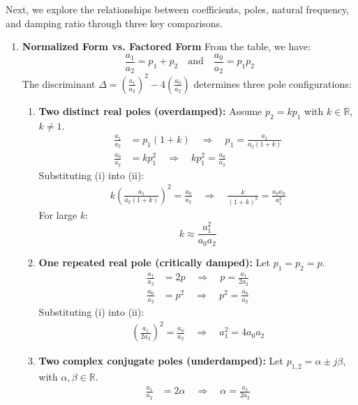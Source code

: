 Next, we explore the relationships between coefficients, poles,
natural frequency, and damping ratio through three key comparisons.
\begin{enumerate}
  \item \textbf{Normalized Form vs. Factored Form}
    \noindent From the table, we have:
    \[ \frac{a_1}{a_2} = p_1 + p_2 \quad \text{and} \quad \frac{a_0}{a_2} = p_1 p_2 \]
    The discriminant
    \(\displaystyle \Delta = \left( \frac{a_1}{a_2} \right)^2 - 4 \left( \frac{a_0}{a_2} \right) \)
    determines three pole configurations:
    \begin{enumerate}
      \item \textbf{Two distinct real poles (overdamped):} Assume \( p_2 = k p_1 \) with \( k \in \mathbb{R} \), \( k \neq 1 \).
        \begin{align*}
          \frac{a_1}{a_2} &= p_1(1 + k) \quad \Rightarrow \quad p_1 = \frac{a_1}{a_2(1 + k)} \tag{i} \\
          \frac{a_0}{a_2} &= k p_1^2 \quad \Rightarrow \quad k p_1^2 = \frac{a_0}{a_2} \tag{ii}
        \end{align*}
        Substituting (i) into (ii):
        \begin{align*}
        k \left( \frac{a_1}{a_2(1 + k)} \right)^2 = \frac{a_0}{a_2}
        \quad \Rightarrow \quad
        \frac{k}{(1+k)^2} = \frac{a_0 a_2}{a_1^2}
        \end{align*}
        For large \(k\):
        \[ k \approx \frac{a_1^2}{a_0 a_2} \]
      \item \textbf{One repeated real pole (critically damped):} Let \( p_1 = p_2 = p \).
        \begin{align*}
          \frac{a_1}{a_2} &= 2p \quad \Rightarrow \quad p = \frac{a_1}{2a_2} \tag{i} \\
          \frac{a_0}{a_2} &= p^2 \quad \Rightarrow \quad p^2 = \frac{a_0}{a_2} \tag{ii}
        \end{align*}
        Substituting (i) into (ii):
        \begin{align*}
          \left( \frac{a_1}{2a_2} \right)^2 = \frac{a_0}{a_2}
          \quad \Rightarrow \quad
          a_1^2 = 4 a_0 a_2
        \end{align*}
      \item \textbf{Two complex conjugate poles (underdamped):} Let \( p_{1,2} = \alpha \pm j\beta \), with \( \alpha, \beta \in \mathbb{R} \).
        \begin{align*}
          \frac{a_1}{a_2} &= 2\alpha \quad \Rightarrow \quad \alpha = \frac{a_1}{2a_2} \tag{i} \\

\end{align*}
\end{enumerate}
\end{enumerate}
